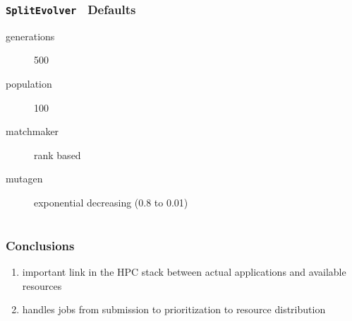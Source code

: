 \documentclass[compress,xcolor=table]{beamer}
\begin{document}

\begin{frame}
  \frametitle{\texttt{SplitEvolver} \textendash\ Defaults}
  \begin{description}
    \item[generations] 500
    \item[population] 100
    \item[matchmaker] rank based
    \item[mutagen] exponential decreasing (0.8 to 0.01)
  \end{description}
\end{frame}



\section*{}

\begin{frame}
  \frametitle{Conclusions}
  \begin{enumerate}
    \item important link in the HPC stack between actual applications and available resources
    \item handles jobs from submission to prioritization to resource distribution
  \end{enumerate}
\end{frame}

{\usebackgroundtemplate{}}


\appendix
\end{document}
